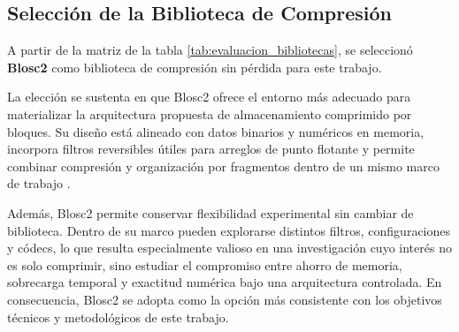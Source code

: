 \subsection{Selección de la Biblioteca de Compresión}

A partir de la matriz de la tabla \ref{tab:evaluacion_bibliotecas}, se seleccionó
\textbf{Blosc2} como biblioteca de compresión sin pérdida para este trabajo.

La elección se sustenta en que Blosc2 ofrece el entorno más adecuado para materializar
la arquitectura propuesta de almacenamiento comprimido por bloques. Su diseño está
alineado con datos binarios y numéricos en memoria, incorpora filtros reversibles útiles
para arreglos de punto flotante y permite combinar compresión y organización por
fragmentos dentro de un mismo marco de trabajo \parencite{blosc2_docs}.

Además, Blosc2 permite conservar flexibilidad experimental sin cambiar de biblioteca.
Dentro de su marco pueden explorarse distintos filtros, configuraciones y códecs, lo que
resulta especialmente valioso en una investigación cuyo interés no es solo comprimir, sino
estudiar el compromiso entre ahorro de memoria, sobrecarga temporal y exactitud
numérica bajo una arquitectura controlada. En consecuencia, Blosc2 se adopta como la
opción más consistente con los objetivos técnicos y metodológicos de este trabajo.
